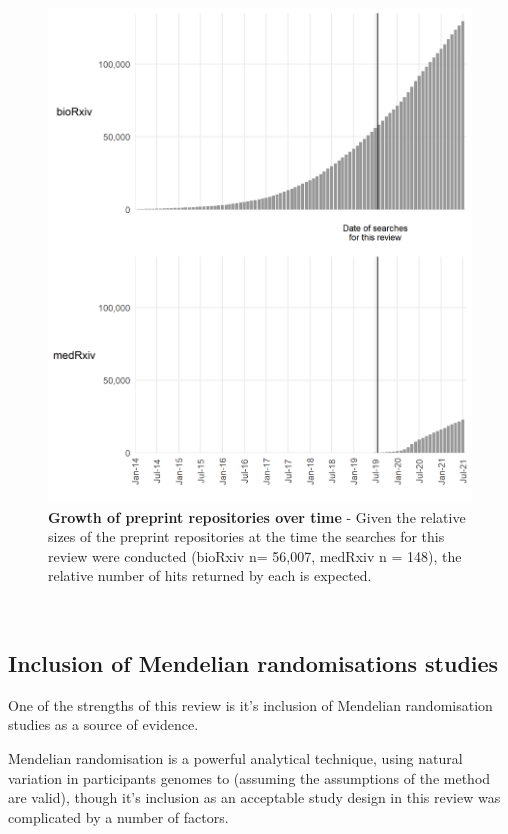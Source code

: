 \documentclass[a4paper, twoside]{templates/ociamthesis}
\begin{document}
\begin{figure}[H]
\includegraphics[width=1\linewidth]{figures/sys-rev/preprint_growth} \caption[Growth of preprint repositories over time]{\textbf{Growth of preprint repositories over time} - Given the relative sizes of the preprint repositories at the time the searches for this review were conducted (bioRxiv n= 56,007, medRxiv n = 148), the relative number of hits returned by each is expected.}\label{fig:preprintGrowth}
\end{figure}

~

\hypertarget{rev-discussion-MR}{%
\subsection{Inclusion of Mendelian randomisations studies}\label{rev-discussion-MR}}

One of the strengths of this review is it's inclusion of Mendelian randomisation studies as a source of evidence.

Mendelian randomisation is a powerful analytical technique, using natural variation in participants genomes to (assuming the assumptions of the method are valid), though it's inclusion as an acceptable study design in this review was complicated by a number of factors.
\end{document}
